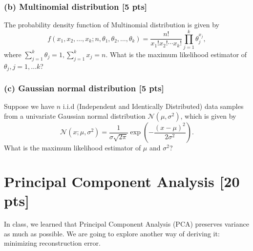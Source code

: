 \documentclass[twoside,10pt]{article}
\begin{document}
\subsubsection*{(b) Multinomial distribution [5 pts]}
The probability density function of Multinomial distribution is given by 
$$f(x_1,x_2,\dots,x_k;n,\theta_1,\theta_2,\dots,\theta_k)=\frac{n!}{x_1!x_2!\cdots x_k!}\prod_{j=1}^{k}\theta_j^{x_j},$$
where $\sum_{j=1}^k\theta_j=1,\sum_{j=1}^k x_j=n$. What is the maximum likelihood estimator of $\theta_j, j=1,\dots k$?

\subsubsection*{(c) Gaussian normal distribution [5 pts]}
Suppose we have $n$ i.i.d (Independent and Identically Distributed)
data samples from a univariate Gaussian normal distribution
$\mathcal{N}(\mu, \sigma^2)$, which is given by
\begin{equation}
\mathcal{N}(x; \mu, \sigma^2) = \frac{1}{\sigma \sqrt{2\pi}} \exp
\left( - \frac{(x - \mu)^2}{2\sigma^2} \right).\nonumber
\end{equation}
What is the maximum likelihood estimator of $\mu$ and $\sigma^2$?
\vspace{1cm}

\section{Principal Component Analysis [20 pts]}
In class, we learned that Principal Component Analysis (PCA)
preserves variance as much as possible. We are going to explore
another way of deriving it: minimizing reconstruction error.
\end{document}
